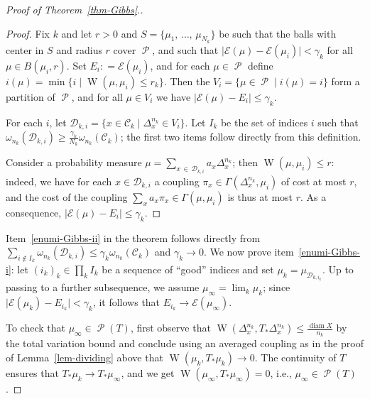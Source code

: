 \documentclass[10pt]{amsart}
\theoremstyle{definition}\newtheorem{defi}[theo]{Definition}\newtheorem{rema}[theo]{Remark}\newtheorem{exam}[theo]{Example}\newtheorem{exem}[theo]{Example}\newtheorem{nota}[theo]{Notation}
\theoremstyle{plain}
\theoremstyle{plain}
\newcommand{\wass}{\operatorname{W}}
\newcommand{\diam}{\operatorname{diam}}
\newcommand\Prob{{\operatorname{\mathscr{P}}}}
\newcommand*\8{\infty}
\newcommand{\En}{\mathcal{E}}
\newcommand{\cD}{\mathcal{D}}
\newcommand{\cC}{\mathcal C}
\begin{document}
\begin{proof}[Proof of Theorem~\ref{thm-Gibbs}.]
\begin{proof}
Fix $k$ and let $r>0$ and $S=\{\mu_1,\,\dots,\,\mu_{N_k}\}$ be such that the balls with center in $S$ and radius $r$ cover $\Prob$, and such that $\lvert\En(\mu)-\En(\mu_i)\rvert<\gamma_k$ for all $\mu\in B(\mu_i,r)$. Set $E_i : =\En(\mu_i)$, and for each $\mu\in\Prob$ define $i(\mu) = \min\{i \mid \wass(\mu,\mu_i)\le r_k\}$. Then the $V_i=\{\mu\in \Prob\mid i(\mu)=i\}$ form a partition of $\Prob$, and for all $\mu\in V_i$ we have $\lvert \En(\mu) - E_i\rvert \le \gamma_k$.

For each $i$, let $\cD_{k,i} = \{x\in \cC_{k} \mid \Delta_x^{n_k}\in V_i\}$. Let $I_k$ be the set of indices $i$ such that $\omega_{n_k}(\cD_{k,i})\ge \frac{\gamma_k}{N_k} \omega_{n_k}(\cC_k)$; the first two items follow directly from this definition.

Consider a probability measure $\mu= \sum_{x\,\in\,\cD_{k,i}} a_x \Delta_x^{n_k}$; then $\wass(\mu,\mu_i)\le r$: indeed, we have for each $x\in \cD_{k,i}$ a coupling $\pi_x\in\Gamma(\Delta_x^{n_k},\mu_i)$ of cost at most $r$, and the cost of the coupling $\sum_x a_x \pi_x\in\Gamma(\mu,\mu_i)$ is thus at most $r$. As a consequence, $\lvert \En(\mu)-E_i\rvert \le \gamma_k$.
\end{proof}

Item~\eqref{enumi-Gibbs-ii} in the theorem follows directly from $\sum_{i\notin I_k}\omega_{n_k}(\cD_{k,i})\le \gamma_k \omega_{n_k}(\cC_k)$ and $\gamma_k\to 0$. We now prove item~\eqref{enumi-Gibbs-i}: let $(i_k)_k \in \prod_k I_k$ be a sequence of ``good'' indices and set $\mu_k = \mu_{\cD_{k,i_k}}$. Up to passing to a further subsequence, we assume $\mu_\infty=\lim_k \mu_k$; since $\lvert \En(\mu_k)-E_{i_k}\rvert < \gamma_k$, it follows that $E_{i_k} \to \En(\mu_\infty)$.

To check that $\mu_\infty\in\Prob(T)$, first observe that $\wass(\Delta_x^{n_k},T_*\Delta_x^{n_k})\le \frac{\diam X}{n_k}$ by the total variation bound and conclude using an averaged coupling as in the proof of Lemma~\ref{lem-dividing} above that $\wass(\mu_k,T_*\mu_k)\to 0$. The continuity of $T$ ensures that $T_*\mu_k\to T_*\mu_\infty$, and we get $\wass(\mu_\infty,T_*\mu_\infty)=0$, i.e., $\mu_\infty\in\Prob(T)$.


\end{proof}
\end{document}
